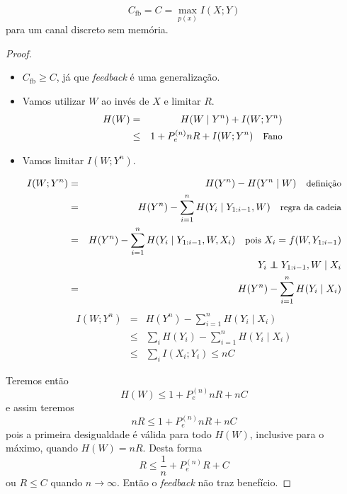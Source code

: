 \begin{frame}[allowframebreaks]
  \framebreak

  \begin{theorem}
  \begin{equation}
  C_{\text{fb}} = C = \max_{p(x)} I(X;Y)
  \end{equation}
  para um canal discreto sem memória.
  \end{theorem}

  \begin{proof}
  \begin{itemize}
  \item $C_{\text{fb}} \geq C$, já que \textit{feedback} é uma generalização.
  \item Vamos utilizar $W$ ao invés de $X$ e limitar $R$.
  	\begin{eqnarray}
	H(W) &=& H(W \mid Y^n) + I(W;Y^n) \nonumber \\
		&\leq& 1 + P_e^{(n)} nR + I(W;Y^n) \quad \text{\small Fano}
	\end{eqnarray}
  \item Vamos limitar $I(W;Y^n)$.
  \end{itemize}

  \proofbreak

  \begin{eqnarray}
  I(W;Y^n) &=& H(Y^n) - H(Y^n \mid W) \quad \text{\small definição} \nonumber \\
	&=& H(Y^n) - \sum_{i=1}^{n} H(Y_i \mid Y_{1:i-1} , W) \quad \text{\small regra da cadeia} \nonumber \\
	&=& H(Y^n) - \sum_{i=1}^{n} H(Y_i \mid  Y_{1:i-1} , W , X_i) \quad \text{\small pois } X_i = f(W, Y_{1:i-1}) \nonumber \\
	&& Y_i \independent Y_{1:i-1} , W \mid X_i \nonumber \\
	&=& H(Y^n) - \sum_{i=1}^{n} H(Y_i \mid X_i) 
  \end{eqnarray}
  \proofbreak
  \begin{eqnarray}
  I(W;Y^n) &=& H(Y^n) - \sum_{i=1}^{n} H(Y_i \mid X_i) \nonumber \\
	&\leq& \sum_i H(Y_i) - \sum_{i=1}^{n} H(Y_i \mid X_i) \nonumber \\
	&\leq& \sum_i I(X_i;Y_i) \leq nC
  \end{eqnarray} 

  \proofbreak
  Teremos então
  \begin{equation}
  H(W) \leq 1 + P_e^{(n)} nR + nC
  \end{equation}
  e assim teremos
  \begin{equation}
  nR \leq 1 + P_e^{(n)} nR + nC
  \end{equation}
  pois a primeira desigualdade é válida para todo $H(W)$, inclusive para o máximo, quando $H(W) = nR$.
  Desta forma
  \begin{equation}
  R \leq \frac{1}{n} + P_e^{(n)} R + C
  \end{equation}
  ou $R \leq C$ quando $n \rightarrow \infty$. Então o \textit{feedback} não traz benefício.
   
  \end{proof}

\end{frame}



